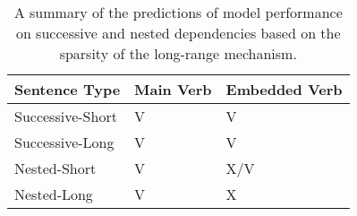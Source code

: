 \begin{center}
\begin{table}
\centering
\begin{tabular}{|P{3.5cm}||P{3.5cm}|P{3.5cm}|}
    \hline
    \B Sentence Type & \B Main Verb & \B Embedded Verb \\
    \hline
    Successive-Short & V  & V \\
    \hline
    Successive-Long & V & V \\
    \hline
    Nested-Short & V & X/V \\
    \hline
    Nested-Long & V & X \\
    \hline
\end{tabular}
\caption{A summary of the predictions of model performance on successive and nested dependencies based on the sparsity of the long-range mechanism.}
\label{tbl:predictions}
\end{table}
\end{center}
